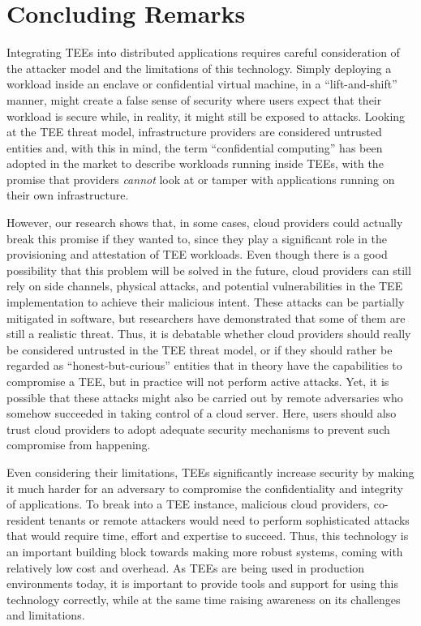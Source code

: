 \section{Concluding Remarks}
\label{thesis:concl-remarks}

Integrating \acp{TEE} into distributed applications requires careful
consideration of the attacker model and the limitations of this technology.
Simply deploying a workload inside an enclave or confidential virtual machine,
in a ``lift-and-shift'' manner, might create a false sense of security where
users expect that their workload is secure while, in reality, it might still be
exposed to attacks. Looking at the \ac{TEE} threat model, infrastructure
providers are considered untrusted entities and, with this in mind, the term
``confidential computing'' has been adopted in the market to describe workloads
running inside \acp{TEE}, with the promise that providers \emph{cannot} look at
or tamper with applications running on their own infrastructure. 

However, our research shows that, in some cases, cloud providers could actually
break this promise if they wanted to, since they play a significant role in the
provisioning and attestation of \ac{TEE} workloads. Even though there is a good
possibility that this problem will be solved in the future, cloud providers can
still rely on side channels, physical attacks, and potential vulnerabilities in
the \ac{TEE} implementation to achieve their malicious intent. These attacks can
be partially mitigated in software, but researchers have demonstrated that some
of them are still a realistic threat. Thus, it is debatable whether cloud
providers should really be considered untrusted in the \ac{TEE} threat model, or
if they should rather be regarded as ``honest-but-curious'' entities that in
theory have the capabilities to compromise a \ac{TEE}, but in practice will not
perform active attacks. Yet, it is possible that these attacks might also be
carried out by remote adversaries who somehow succeeded in taking control of a
cloud server. Here, users should also trust cloud providers to adopt adequate
security mechanisms to prevent such compromise from happening.

Even considering their limitations, \acp{TEE} significantly increase security by
making it much harder for an adversary to compromise the confidentiality and
integrity of applications. To break into a \ac{TEE} instance, malicious cloud
providers, co-resident tenants or remote attackers would need to perform
sophisticated attacks that would require time, effort and expertise to succeed.
Thus, this technology is an important building block towards making more robust
systems, coming with relatively low cost and overhead. As \acp{TEE} are being
used in production environments today, it is important to provide tools and
support for using this technology correctly, while at the same time raising
awareness on its challenges and limitations.